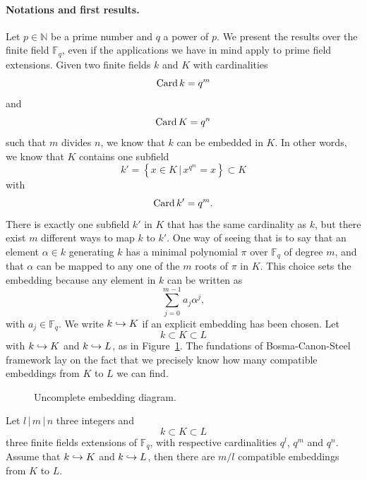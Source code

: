 \paragraph{Notations and first results.} Let $p\in\mathbb{N}$ be a prime number
and $q$ a power of $p$. We present the results over the finite field
$\mathbb{F}_q$, even if the applications we have in mind apply to prime field
extensions. Given two finite fields $k$ and $K$ with cardinalities
\[
  \operatorname{Card} k = q^m
\]
and
\[
  \operatorname{Card} K =  q^n
\]
such that $m$ divides $n$, we know that $k$ can be embedded in $K$. In other
words, we know that $K$ contains one subfield
\[
  k'=\left\{ x\in K\,|\,x^{q^m}=x \right\}\subset K
\]
with 
\[
  \operatorname{Card} k' = q^m.
\]
There is exactly one subfield $k'$ in $K$ that has the same cardinality as $k$,
but there exist $m$ different ways to map $k$ to $k'$. One way of seeing that is
to say that an element $\alpha\in k$ generating $k$ has a minimal polynomial
$\pi$ over $\mathbb{F}_q$ of degree $m$, and that $\alpha$ can be mapped to any
one of the $m$ roots of $\pi$ in $K$. This choice sets the embedding because any
element in $k$ can be written as
\[
  \sum_{j=0}^{m-1}a_j \alpha^j,
\]
with $a_j\in\mathbb{F}_q$. We write $k\hookrightarrow K$ if an explicit embedding has been
chosen. Let
\[
  k\subset K\subset L
\]
with $k\hookrightarrow K$ and $k\hookrightarrow L$, as in Figure~\ref{fig:uncomplete}. The fundations
of Bosma-Canon-Steel framework lay on the fact that we precisely know how many
compatible embeddings from $K$ to $L$ we can find.
  \begin{figure}%
    \centering
  \caption{Uncomplete embedding diagram.}
  \label{fig:uncomplete}
  \end{figure}
  \begin{prop}
    \label{prop:number-embeddings}
    Let $l\,|\,m\,|\,n$ three integers and
    \[
      k\subset K\subset L
    \]
    three finite fields extensions of $\mathbb{F}_q$, with respective
    cardinalities $q^l$, $q^m$ and $q^n$. Assume that $k\hookrightarrow K$ and $k\hookrightarrow L$,
    then there are $m/l$ compatible embeddings from $K$ to $L$.
  \end{prop}
